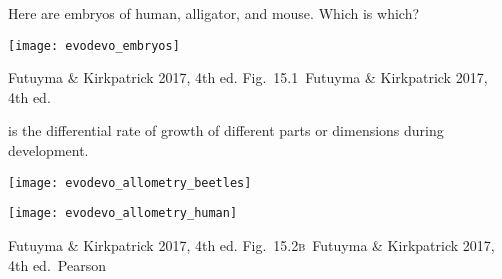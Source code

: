 \documentclass[t,handout]{beamer}  %
\newcommand{\futuyma}[1]{%
	\ifthenelse{\isempty{#1}}%
	{Futuyma \& Kirkpatrick 2017, 4th ed.}%
	{Fig.~#1~Futuyma \& Kirkpatrick 2017, 4th ed.}%
}
\newcommand{\backskip}{\vspace{-0.5\baselineskip}}
\begin{document}

{
\begin{frame}[b]

\end{frame}
}

\begin{frame}{Here are embryos of human, alligator, and mouse. Which is which?}

\backskip

\texttt{[image: evodevo\_embryos]}

\pause



\tinyfill \futuyma{15.1}

\end{frame}


\begin{frame}{ is the differential rate of growth of different parts or dimensions during development.}

\backskip

\begin{multicols}{2}

\texttt{[image: evodevo\_allometry\_beetles]}
	
\columnbreak

\texttt{[image: evodevo\_allometry\_human]}

\end{multicols}

\vfilll

\tiny \futuyma{15.2\textsc{b}} \hfill \textcopyright\,Pearson

\end{frame}

\end{document}
